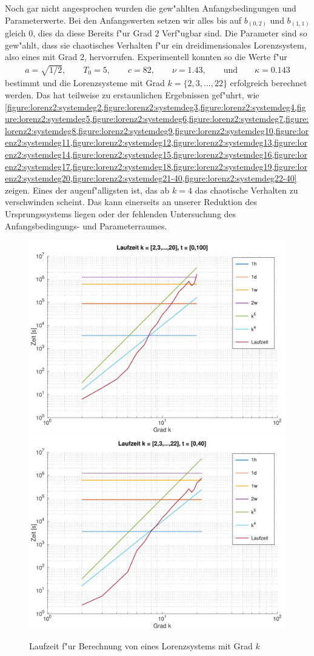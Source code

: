 Noch gar nicht angesprochen wurden die gew"ahlten Anfangsbedingungen und 
Parameterwerte. Bei den Anfangswerten setzen wir alles bis auf $b_{(0,2)}$ und 
$b_{(1,1)}$ gleich $0$, dies da diese Bereits f"ur Grad $2$ Verf"ugbar sind. 
Die Parameter sind so gew"ahlt, dass sie chaotisches Verhalten f"ur ein 
dreidimensionales Lorenzsystem, also eines mit Grad $2$, hervorrufen. 
Experimentell konnten so die Werte f"ur
\begin{align*}
	a = \sqrt{1/2},
	\qquad T_0 = 5,
	\qquad c = 82,
	\qquad \nu = 1.43,
	\qquad \text{und}
	\qquad \kappa = 0.143
\end{align*}
bestimmt und die Lorenzsysteme mit Grad $k = \{2,3,\dots,22\}$ erfolgreich 
berechnet werden. Das hat teilweise zu erstaunlichen Ergebnissen gef"uhrt, wie 
\cref{figure:lorenz2:systemdeg2,figure:lorenz2:systemdeg3,figure:lorenz2:systemdeg4,figure:lorenz2:systemdeg5,figure:lorenz2:systemdeg6,figure:lorenz2:systemdeg7,figure:lorenz2:systemdeg8,figure:lorenz2:systemdeg9,figure:lorenz2:systemdeg10,figure:lorenz2:systemdeg11,figure:lorenz2:systemdeg12,figure:lorenz2:systemdeg13,figure:lorenz2:systemdeg14,figure:lorenz2:systemdeg15,figure:lorenz2:systemdeg16,figure:lorenz2:systemdeg17,figure:lorenz2:systemdeg18,figure:lorenz2:systemdeg19,figure:lorenz2:systemdeg20,figure:lorenz2:systemdeg21-40,figure:lorenz2:systemdeg22-40}
zeigen. Eines der augenf"alligsten ist, das ab $k = 4$ das chaotische Verhalten 
zu verschwinden scheint. Das kann einerseits an unserer Reduktion des 
Ursprungssystems liegen oder der fehlenden Untersuchung des Anfangsbedingungs- 
und Parameterraumes.

\begin{figure}
	\centering
	\includegraphics[width=0.49\linewidth]{lorenz2/03-images/timing_100}
	\includegraphics[width=0.49\linewidth]{lorenz2/03-images/timing_40}
	\caption{Laufzeit f"ur Berechnung von eines Lorenzsystems mit Grad $k$}
	\label{figure:lorenz2:timings}
\end{figure}

